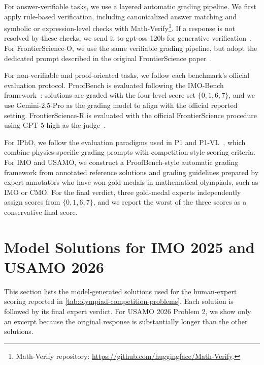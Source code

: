 \documentclass{llmxive}
\providecommand{\solutionheading}[1]{\par\smallskip\noindent\textbf{#1}\par}
\providecommand{\compactbullet}[1]{\par\noindent$\triangleright$~#1\par}
\providecommand{\compactnumber}[2]{\par\noindent\textbf{#1.}~#2\par}
\begin{document}
For answer-verifiable tasks, we use a layered automatic grading pipeline. We first apply rule-based verification, including canonicalized answer matching and symbolic or expression-level checks with Math-Verify\footnote{Math-Verify repository: \url{https://github.com/huggingface/Math-Verify}.}. If a response is not resolved by these checks, we send it to gpt-oss-120b for generative verification~\citep{openai2025gptoss}. For FrontierScience-O, we use the same verifiable grading pipeline, but adopt the dedicated prompt described in the original FrontierScience paper~\citep{wang2026frontierscience}.

For non-verifiable and proof-oriented tasks, we follow each benchmark's official evaluation protocol. ProofBench is evaluated following the IMO-Bench framework~\citep{luong2025imobench}: solutions are graded with the four-level score set \(\{0,1,6,7\}\), and we use Gemini-2.5-Pro as the grading model to align with the official reported setting. FrontierScience-R is evaluated with the official FrontierScience procedure using GPT-5-high as the judge~\citep{wang2026frontierscience}.

For IPhO, we follow the evaluation paradigms used in P1 and P1-VL~\citep{chen2025p1,luo2026p1vl}, which combine physics-specific grading prompts with competition-style scoring criteria. For IMO and USAMO, we construct a ProofBench-style automatic grading framework from annotated reference solutions and grading guidelines prepared by expert annotators who have won gold medals in mathematical olympiads, such as IMO or CMO. For the final verdict, three gold-medal experts independently assign scores from \(\{0,1,6,7\}\), and we report the worst of the three scores as a conservative final score.


\section{Model Solutions for IMO 2025 and USAMO 2026}
\label{app:olympiad-solutions}
This section lists the model-generated solutions used for the human-expert scoring reported in \cref{tab:olympiad-competition-problems}. Each solution is followed by its final expert verdict. For USAMO 2026 Problem 2, we show only an excerpt because the original response is substantially longer than the other solutions.

\begingroup
\footnotesize
\sloppy


\setlength{\abovedisplayskip}{3pt}
\setlength{\belowdisplayskip}{3pt}
\setlength{\abovedisplayshortskip}{2pt}
\setlength{\belowdisplayshortskip}{2pt}
\renewcommand{\solutionheading}[1]{\par\smallskip\noindent\textbf{#1}\par}
\renewcommand{\compactbullet}[1]{\par\noindent$\triangleright$~#1\par}
\renewcommand{\compactnumber}[2]{\par\noindent\textbf{#1.}~#2\par}
\end{document}
